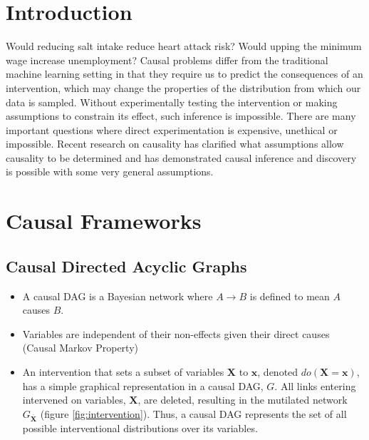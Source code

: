 \documentclass[b0,landscape,25pt]{sciposter}
\begin{document}

\begin{multicols}{5} %



\color{DarkSlateGray} %

\section*{Introduction}

Would reducing salt intake reduce heart attack risk? Would upping the minimum wage increase unemployment? Causal problems differ from the traditional machine learning setting in that they require us to predict the consequences of an intervention, which may change the properties of the distribution from which our data is sampled. Without experimentally testing the intervention or making assumptions to constrain its effect, such inference is impossible. There are many important questions where direct experimentation is expensive, unethical or impossible. Recent research on causality has clarified what assumptions allow causality to be determined and has demonstrated causal inference and discovery is possible with some very general assumptions.   

\section*{Causal Frameworks}
\subsection*{Causal Directed Acyclic Graphs}
\begin{itemize}
\item A causal DAG is a Bayesian network where $A \rightarrow B$ is defined to mean $A$ causes $B$.
\item Variables are independent of their non-effects given their direct causes (Causal Markov Property)
\item An intervention that sets a subset of variables $\boldsymbol{X}$ to $\boldsymbol{x}$, denoted $do(\boldsymbol{X} = \boldsymbol{x})$, has a simple graphical representation in a causal DAG, $G$. All links entering intervened on variables, $\boldsymbol{X}$, are deleted, resulting in the mutilated network $G_{\overline{\boldsymbol{X}}}$ (figure \ref{fig:intervention}). Thus, a causal DAG represents the set of all possible interventional distributions over its variables.
\end{itemize}


\end{multicols}
\end{document}
